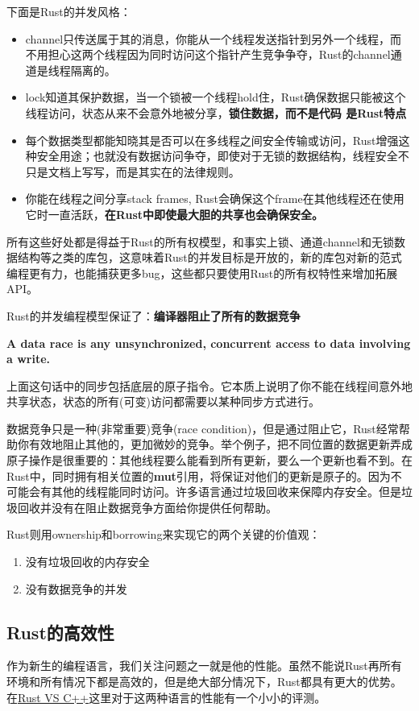 \documentclass[12pt, a4paper]{article}
\begin{document}
	下面是Rust的并发风格：
	
	\begin{itemize}
	\item channel只传送属于其的消息，你能从一个线程发送指针到另外一个线程，而不用担心这两个线程因为同时访问这个指针产生竞争争夺，Rust的channel通道是线程隔离的。
	\item lock知道其保护数据，当一个锁被一个线程hold住，Rust确保数据只能被这个线程访问，状态从来不会意外地被分享，\textbf{锁住数据，而不是代码 是Rust特点}
	\item 每个数据类型都能知晓其是否可以在多线程之间安全传输或访问，Rust增强这种安全用途；也就没有数据访问争夺，即使对于无锁的数据结构，线程安全不只是文档上写写，而是其实在的法律规则。
	\item 你能在线程之间分享stack frames, Rust会确保这个frame在其他线程还在使用它时一直活跃，\textbf{在Rust中即使最大胆的共享也会确保安全。}
	\end{itemize}
	
	所有这些好处都是得益于Rust的所有权模型，和事实上锁、通道channel和无锁数据结构等之类的库包，这意味着Rust的并发目标是开放的，新的库包对新的范式编程更有力，也能捕获更多bug，这些都只要使用Rust的所有权特性来增加拓展API。
	
	Rust的并发编程模型保证了：\textbf{编译器阻止了所有的数据竞争}
	
	\textbf{A data race is any unsynchronized, concurrent access to data involving a write.}
	
	上面这句话中的同步包括底层的原子指令。它本质上说明了你不能在线程间意外地共享状态，状态的所有(可变)访问都需要以某种同步方式进行。
	
	数据竞争只是一种(非常重要)竞争(race condition)，但是通过阻止它，Rust经常帮助你有效地阻止其他的，更加微妙的竞争。举个例子，把不同位置的数据更新弄成原子操作是很重要的：其他线程要么能看到所有更新，要么一个更新也看不到。在Rust中，同时拥有相关位置的\textbf{mut}引用，将保证对他们的更新是原子的。因为不可能会有其他的线程能同时访问。许多语言通过垃圾回收来保障内存安全。但是垃圾回收并没有在阻止数据竞争方面给你提供任何帮助。
	
	Rust则用ownership和borrowing来实现它的两个关键的价值观：
	\begin{enumerate}
	\item  没有垃圾回收的内存安全
	\item  没有数据竞争的并发
	\end{enumerate}

	\subsection{Rust的高效性}
	作为新生的编程语言，我们关注问题之一就是他的性能。虽然不能说Rust再所有环境和所有情况下都是高效的，但是绝大部分情况下，Rust都具有更大的优势。在\href{http://cantrip.org/rust-vs-c++.html}{Rust VS C++}这里对于这两种语言的性能有一个小小的评测。
	
\end{document}
